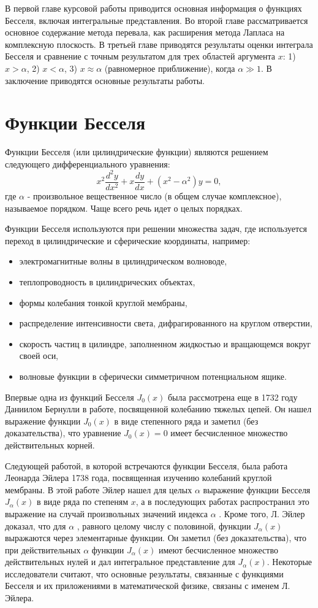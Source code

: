 \documentclass[14pt]{extarticle}
\begin{document}
В первой главе курсовой работы приводится основная информация о функциях Бесселя, включая интегральные представления. Во второй главе рассматривается основное содержание метода перевала, как расширения метода Лапласа на комплексную плоскость. В третьей главе приводятся результаты оценки интеграла Бесселя и сравнение с точным результатом для трех областей аргумента $x$: 1) $x>\alpha$, 2) $x<\alpha$, 3) $x\approx\alpha$ (равномерное приближение), когда $\alpha\gg1$. В заключение приводятся основные результаты работы. 


\section{Функции Бесселя}
Функции Бесселя (или цилиндрические функции) являются решением следующего дифференциального уравнения:
\begin{equation}\label{eq:eq4}
x^2\frac{d^2 y}{dx^2}+x\frac{dy}{dx}+(x^2-\alpha^2)y = 0,
\end{equation}
где $\alpha$ - произвольное вещественное число (в общем случае комплексное), называемое порядком. Чаще всего речь идет о целых порядках.

Функции Бесселя используются при решении множества задач, где используется переход в цилиндрические и сферические координаты, например:
\begin{itemize}
	\item электромагнитные волны в цилиндрическом волноводе,
	\item теплопроводность в цилиндрических объектах,
	\item формы колебания тонкой круглой мембраны,
	\item распределение интенсивности света, дифрагированного на круглом отверстии,
	\item скорость частиц в цилиндре, заполненном жидкостью и вращающемся вокруг своей оси,
	\item волновые функции в сферически симметричном потенциальном ящике.
\end{itemize}

Впервые одна из функций Бесселя $J_0(x)$ была рассмотрена еще в 1732 году Даниилом Бернулли в работе, посвященной колебанию тяжелых цепей. Он нашел выражение функции $J_0(x)$ в виде степенного ряда и заметил (без доказательства), что уравнение $J_0(x)=0$ имеет бесчисленное множество действительных корней. 

Следующей работой, в которой встречаются функции Бесселя, была работа Леонарда Эйлера 1738 года, посвященная изучению колебаний круглой мембраны. В этой работе Эйлер нашел для целых $\alpha$ выражение функции Бесселя $J_\alpha(x)$ в виде ряда по степеням $x$, а в последующих работах распространил это выражение на случай произвольных значений индекса $\alpha$ . Кроме того, Л. Эйлер доказал, что для $\alpha$ , равного целому числу с половиной, функции $J_\alpha(x)$ выражаются через элементарные функции. Он заметил (без доказательства), что при действительных $\alpha$ функции $J_\alpha(x)$ имеют бесчисленное множество действительных нулей и дал интегральное представление для $J_\alpha(x)$. Некоторые исследователи считают, что основные результаты, связанные с функциями Бесселя и их приложениями в математической физике, связаны с именем Л. Эйлера. \cite{Urmat}  
\end{document}
